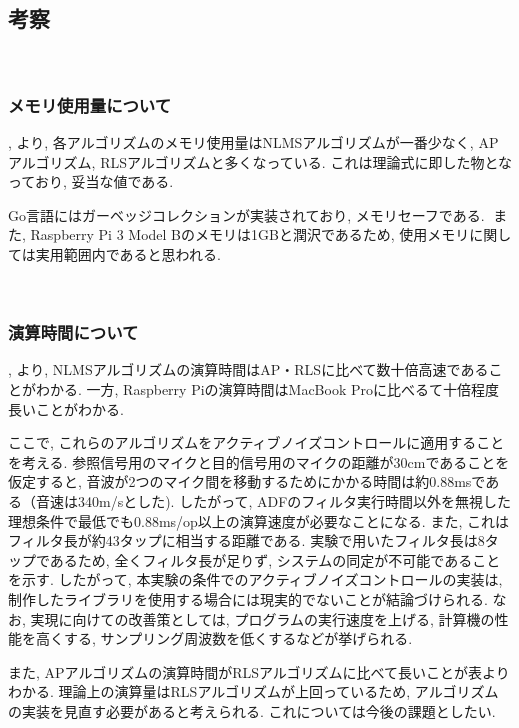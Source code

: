 \subsection{考察}\label{consideration-color}

\
\subsubsection{メモリ使用量について}\label{about-memory}

, より, 各アルゴリズムのメモリ使用量はNLMSアルゴリズムが一番少なく, APアルゴリズム, RLSアルゴリズムと多くなっている. これは理論式に即した物となっており, 妥当な値である. 

Go言語にはガーベッジコレクションが実装されており, メモリセーフである. また, Raspberry
Pi 3 Model
Bのメモリは1GBと潤沢であるため, 使用メモリに関しては実用範囲内であると思われる. 

\
\subsubsection{演算時間について}\label{about-time}

, より, NLMSアルゴリズムの演算時間はAP・RLSに比べて数十倍高速であることがわかる. 一方, Raspberry
Piの演算時間はMacBook Proに比べるて十倍程度長いことがわかる. 

ここで, これらのアルゴリズムをアクティブノイズコントロールに適用することを考える. 
参照信号用のマイクと目的信号用のマイクの距離が30cmであることを仮定すると, 音波が2つのマイク間を移動するためにかかる時間は約0.88msである（音速は340m/sとした). 
したがって, ADFのフィルタ実行時間以外を無視した理想条件で最低でも0.88ms/op以上の演算速度が必要なことになる. 
また, これはフィルタ長が約43タップに相当する距離である. 実験で用いたフィルタ長は8タップであるため, 全くフィルタ長が足りず, システムの同定が不可能であることを示す. 
したがって, 本実験の条件でのアクティブノイズコントロールの実装は, 制作したライブラリを使用する場合には現実的でないことが結論づけられる. 
なお, 実現に向けての改善策としては, プログラムの実行速度を上げる, 計算機の性能を高くする, サンプリング周波数を低くするなどが挙げられる. 


また, APアルゴリズムの演算時間がRLSアルゴリズムに比べて長いことが表よりわかる. 理論上の演算量はRLSアルゴリズムが上回っているため, アルゴリズムの実装を見直す必要があると考えられる. これについては今後の課題としたい. 
